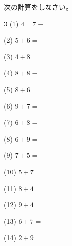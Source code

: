 \documentclass[a4paper, 11pt]{ltjsarticle}
\begin{document}
\hfill

\vspace*{2ex}
次の計算をしなさい。
\vspace*{5ex}

\begin{multicols*}{3}
\noindent (1) \quad $4 + 7 =$
\vspace*{\fill}

\noindent (2) \quad $5 + 6 =$
\vspace*{\fill}

\noindent (3) \quad $4 + 8 =$
\vspace*{\fill}

\noindent (4) \quad $8 + 8 =$
\vspace*{\fill}

\noindent (5) \quad $8 + 6 =$
\vspace*{\fill}

\noindent (6) \quad $9 + 7 =$
\vspace*{\fill}

\noindent (7) \quad $6 + 8 =$
\vspace*{\fill}

\noindent (8) \quad $6 + 9 =$
\vspace*{\fill}

\noindent (9) \quad $7 + 5 =$
\vspace*{\fill}

\noindent (10) \quad $5 + 7 =$
\vspace*{\fill}

\noindent (11) \quad $8 + 4 =$
\vspace*{\fill}

\noindent (12) \quad $9 + 4 =$
\vspace*{\fill}
\columnbreak

\noindent (13) \quad $6 + 7 =$
\vspace*{\fill}

\noindent (14) \quad $2 + 9 =$
\vspace*{\fill}


\end{multicols*}
\end{document}
